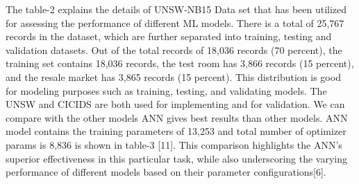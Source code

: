 \documentclass{llncs}
\begin{document}
The table-2 explains the details of UNSW-NB15 Data set that has been utilized for assessing the performance of different ML models. There is a total of 25,767 records in the dataset, which are further separated into training, testing and validation datasets. Out of the total records of 18,036 records (70 percent), the training set contains 18,036 records, the test room has 3,866 records (15 percent), and the resale market has 3,865 records (15 percent). This distribution is good for modeling purposes such as training, testing, and validating models.
The UNSW and CICIDS are both used for implementing and for validation. We can compare with the other models ANN gives best results than other models. ANN model contains the training parameters of 13,253 and total number of optimizer params is 8,836 is shown in table-3 [11]. This comparison highlights the ANN’s superior effectiveness in this particular task, while also underscoring the varying performance of different models based on their parameter configurations[6].




\end{document}
